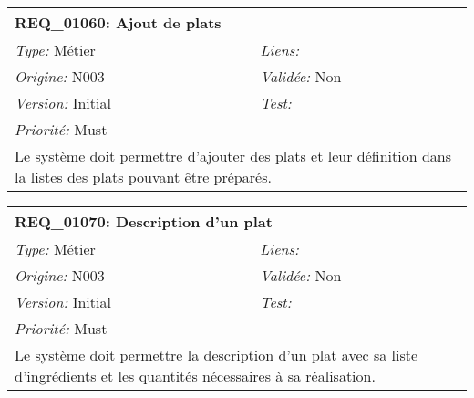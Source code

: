 \begin{table}[!h]

\begin{tabular}{|p{60mm}p{100mm}|}

\hline

\multicolumn{2}{|l|}{\textbf{REQ\_01060:} Ajout de plats} \\ \hline

\emph{Type:} Métier & \emph{Liens:}  \\

\emph{Origine:} N003 & \emph{Validée:} Non \\

\emph{Version:} Initial & \emph{Test:}  \\

\emph{Priorité:} Must & \\ \hline

\multicolumn{2}{|p{16cm}|}{Le système doit permettre d'ajouter des plats et leur définition dans la listes des plats pouvant être préparés.} \\ \hline

\end{tabular}

\end{table}



\begin{table}[!h]

\begin{tabular}{|p{60mm}p{100mm}|}

\hline

\multicolumn{2}{|l|}{\textbf{REQ\_01070:} Description d'un plat} \\ \hline

\emph{Type:} Métier & \emph{Liens:}  \\

\emph{Origine:} N003 & \emph{Validée:} Non \\

\emph{Version:} Initial & \emph{Test:}  \\

\emph{Priorité:} Must & \\ \hline

\multicolumn{2}{|p{16cm}|}{Le système doit permettre la description d'un plat avec sa liste d'ingrédients et les quantités nécessaires à sa réalisation.} \\ \hline

\end{tabular}

\end{table}



